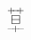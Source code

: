 \[
\mathop{\boxminus}\limits^{+\hspace{-0.25em}-\hspace{-0.25em}+}_{\Large-\hspace{-0.15em}+\hspace{-0.15em}-}
\]
